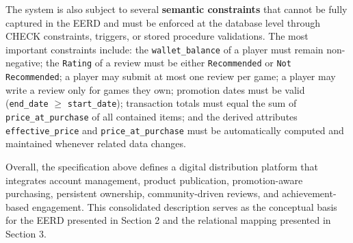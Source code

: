 The system is also subject to several \textbf{semantic constraints} that cannot be fully captured in the EERD and must be enforced at the database level through CHECK constraints, triggers, or stored procedure validations. The most important constraints include: the \texttt{wallet\_balance} of a player must remain non-negative; the \texttt{Rating} of a review must be either \texttt{Recommended} or \texttt{Not Recommended}; a player may submit at most one review per game; a player may write a review only for games they own; promotion dates must be valid (\texttt{end\_date} $\geq$ \texttt{start\_date}); transaction totals must equal the sum of \texttt{price\_at\_purchase} of all contained items; and the derived attributes \texttt{effective\_price} and \texttt{price\_at\_purchase} must be automatically computed and maintained whenever related data changes.

Overall, the specification above defines a digital distribution platform that integrates account management, product publication, promotion-aware purchasing, persistent ownership, community-driven reviews, and achievement-based engagement. This consolidated description serves as the conceptual basis for the EERD presented in Section 2 and the relational mapping presented in Section 3.
\newpage
